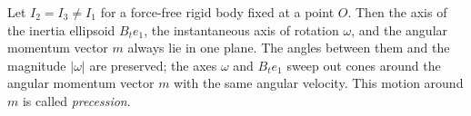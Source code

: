 Let $I_2 = I_3 \neq I_1$ for a force-free rigid body fixed at a point $O$. Then the axis of the inertia ellipsoid $B_t e_1$, the instantaneous axis of rotation $\omega$, and the angular momentum vector $m$ always lie in one plane. The angles between them and the magnitude $|\omega|$ are preserved; the axes $\omega$ and $B_t e_1$ sweep out cones around the angular momentum vector $m$ with the same angular velocity. This motion around $m$ is called \textit{precession}.
